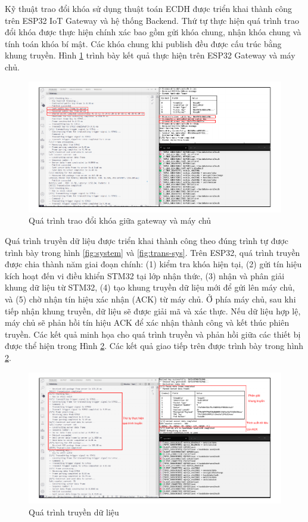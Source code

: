 Kỹ thuật trao đổi khóa sử dụng thuật toán ECDH được triển khai thành công trên ESP32 IoT Gateway và hệ thống Backend. Thứ tự thực hiện quá trình trao đổi khóa được thực hiện chính xác bao gồm gửi khóa chung, nhận khóa chung và tính toán khóa bí mật. Các khóa chung khi publish đều được cấu trúc bằng khung truyền. Hình \ref{fig:logecdh} trình bày kết quả thực hiện trên ESP32 Gateway và máy chủ.

\begin{figure}[h]
    \centering
    \includegraphics[width=1\linewidth]{ecdhlog.pdf}
    \caption{Quá trình trao đổi khóa giữa gateway và máy chủ}
    \label{fig:logecdh}
\end{figure}

Quá trình truyền dữ liệu được triển khai thành công theo đúng trình tự được trình bày trong hình \ref{fig:system} và \ref{fig:trans-sys}. Trên ESP32, quá trình truyền được chia thành năm giai đoạn chính: (1) kiểm tra khóa hiện tại, (2) gửi tín hiệu kích hoạt đến vi điều khiển STM32 tại lớp nhận thức, (3) nhận và phân giải khung dữ liệu từ STM32, (4) tạo khung truyền dữ liệu mới để gửi lên máy chủ, và (5) chờ nhận tín hiệu xác nhận (ACK) từ máy chủ. 
Ở phía máy chủ, sau khi tiếp nhận khung truyền, dữ liệu sẽ được giải mã và xác thực. Nếu dữ liệu hợp lệ, máy chủ sẽ phản hồi tín hiệu ACK để xác nhận thành công và kết thúc phiên truyền. Các kết quả minh họa cho quá trình truyền và phản hồi giữa các thiết bị được thể hiện trong Hình \ref{fig:datalog}. Các kết quả giao tiếp trên được trình bày trong hình \ref{fig:datalog}.
\begin{figure}[h]
    \centering
    \includegraphics[width=1\linewidth]{datalog.pdf}
    \caption{Quá trình truyền dữ liệu}
    \label{fig:datalog}
\end{figure}

